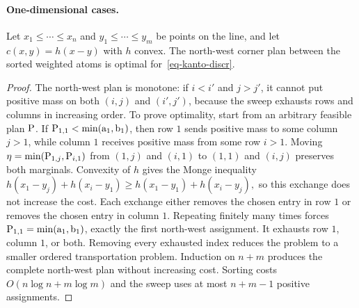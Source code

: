 \paragraph{One-dimensional cases.}
\begin{prop}\label{prop-1d-weighted-sweep}
Let $x_1\leq\cdots\leq x_n$ and $y_1\leq\cdots\leq y_m$ be points on the line, and let $c(x,y)=h(x-y)$ with $h$ convex. The north-west corner plan between the sorted weighted atoms is optimal for~\eqref{eq-kanto-discr}.
\end{prop}
\begin{proof}
The north-west plan is monotone: if $i<i'$ and $j>j'$, it cannot put positive mass on both $(i,j)$ and $(i',j')$, because the sweep exhausts rows and columns in increasing order. To prove optimality, start from an arbitrary feasible plan $\P$. If
$\P_{1,1}<\min(\a_1,\b_1)$, then row $1$ sends positive mass to some column $j>1$, while column $1$ receives positive mass from some row $i>1$. Moving
\(\eta=\min(\P_{1,j},\P_{i,1})\)
from $(1,j)$ and $(i,1)$ to $(1,1)$ and $(i,j)$ preserves both marginals. Convexity of $h$ gives the Monge inequality
\(h(x_1-y_j)+h(x_i-y_1) \geq h(x_1-y_1)+h(x_i-y_j),\)
so this exchange does not increase the cost. Each exchange either removes the chosen entry in row $1$ or removes the chosen entry in column $1$. Repeating finitely many times forces
$\P_{1,1}=\min(\a_1,\b_1)$, exactly the first north-west assignment. It exhausts row $1$, column $1$, or both. Removing every exhausted index reduces the problem to a smaller ordered transportation problem. Induction on $n+m$ produces the complete north-west plan without increasing cost. Sorting costs $O(n\log n+m\log m)$ and the sweep uses at most $n+m-1$ positive assignments.
\end{proof}

